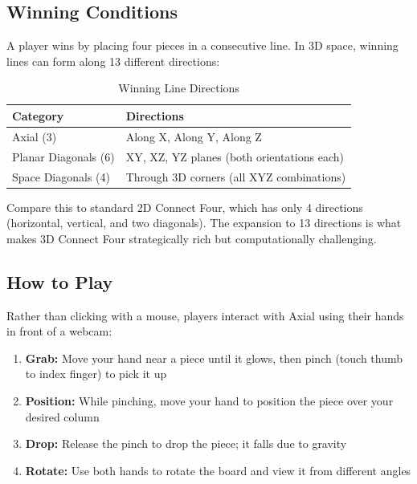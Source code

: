 \documentclass[11pt]{article}
\begin{document}

\subsection{Winning Conditions}

A player wins by placing four pieces in a consecutive line. In 3D space, winning lines can form along 13 different directions:

\begin{table}[H]
\centering
\caption{Winning Line Directions}
\begin{tabular}{ll}
\toprule
\textbf{Category} & \textbf{Directions} \\
\midrule
Axial (3) & Along X, Along Y, Along Z \\
Planar Diagonals (6) & XY, XZ, YZ planes (both orientations each) \\
Space Diagonals (4) & Through 3D corners (all XYZ combinations) \\
\bottomrule
\end{tabular}
\end{table}

Compare this to standard 2D Connect Four, which has only 4 directions (horizontal, vertical, and two diagonals). The expansion to 13 directions is what makes 3D Connect Four strategically rich but computationally challenging.

\subsection{How to Play}

Rather than clicking with a mouse, players interact with Axial using their hands in front of a webcam:

\begin{enumerate}
    \item \textbf{Grab:} Move your hand near a piece until it glows, then pinch (touch thumb to index finger) to pick it up
    \item \textbf{Position:} While pinching, move your hand to position the piece over your desired column
    \item \textbf{Drop:} Release the pinch to drop the piece; it falls due to gravity
    \item \textbf{Rotate:} Use both hands to rotate the board and view it from different angles
\end{enumerate}
\end{document}
